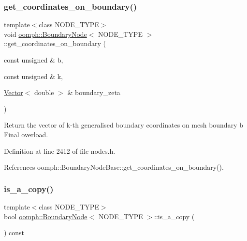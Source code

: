 \subsubsection{\texorpdfstring{get\+\_\+coordinates\+\_\+on\+\_\+boundary()}{get\_coordinates\_on\_boundary()}\hspace{0.1cm}{\footnotesize\ttfamily [2/2]}}
{\footnotesize\ttfamily template$<$class N\+O\+D\+E\+\_\+\+T\+Y\+PE$>$ \\
void \hyperlink{classoomph_1_1BoundaryNode}{oomph\+::\+Boundary\+Node}$<$ N\+O\+D\+E\+\_\+\+T\+Y\+PE $>$\+::get\+\_\+coordinates\+\_\+on\+\_\+boundary (\begin{DoxyParamCaption}\item[{const unsigned \&}]{b,  }\item[{const unsigned \&}]{k,  }\item[{\hyperlink{classoomph_1_1Vector}{Vector}$<$ double $>$ \&}]{boundary\+\_\+zeta }\end{DoxyParamCaption})\hspace{0.3cm}{\ttfamily [inline]}}



Return the vector of k-\/th generalised boundary coordinates on mesh boundary b Final overload. 



Definition at line 2412 of file nodes.\+h.



References oomph\+::\+Boundary\+Node\+Base\+::get\+\_\+coordinates\+\_\+on\+\_\+boundary().

\mbox{\label{classoomph_1_1BoundaryNode_a373e3a5c0f617eb91a54fa88c8e83c9e}} 
\subsubsection{\texorpdfstring{is\+\_\+a\+\_\+copy()}{is\_a\_copy()}\hspace{0.1cm}{\footnotesize\ttfamily [1/2]}}
{\footnotesize\ttfamily template$<$class N\+O\+D\+E\+\_\+\+T\+Y\+PE$>$ \\
bool \hyperlink{classoomph_1_1BoundaryNode}{oomph\+::\+Boundary\+Node}$<$ N\+O\+D\+E\+\_\+\+T\+Y\+PE $>$\+::is\+\_\+a\+\_\+copy (\begin{DoxyParamCaption}{ }\end{DoxyParamCaption}) const\hspace{0.3cm}{\ttfamily [inline]}}



